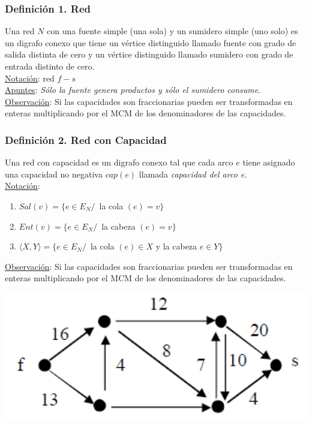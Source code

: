 \documentclass{article}
\newcommand{\tq}{/\,}                                   %
\begin{document}
\subsubsection*{Definición 1. Red}
Una red $N$ con una fuente simple (una sola) y un sumidero simple (uno solo) es un digrafo
conexo que tiene un vértice distinguido llamado fuente con grado de salida distinta de
cero y un vértice distinguido llamado sumidero con grado de entrada distinto de cero.
\\\underline{Notación}: red $f-s$
\\\underline{Apuntes}: \emph{Sólo la fuente genera productos y sólo el sumidero consume}.
\\\underline{Observación}: Si las capacidades son fraccionarias pueden ser transformadas en enteras
multiplicando por el MCM de los denominadores de las capacidades.

\subsubsection*{Definición 2. Red con Capacidad}
Una red con capacidad es un digrafo conexo tal que cada arco $e$ tiene
asignado una capacidad no negativa $cap(e)$ llamada \emph{capacidad del arco e}.
\\\underline{Notación}:
\begin{enumerate}
    \item $Sal(v) = \{ e \in E_N \tq$ la cola $(e) = v \}$
    \item $Ent(v) = \{ e \in E_N \tq$ la cabeza $(e) = v \}$
    \item $\langle X,Y \rangle = \{ e \in E_N \tq$ la cola $(e) \in X$ y la cabeza $e \in Y \}$
\end{enumerate}
\underline{Observación}: Si las capacidades son fraccionarias pueden ser transformadas en enteras
multiplicando por el MCM de los denominadores de las capacidades.
\begin{center}
    \includegraphics[width=.60\textwidth]{redDeFlujo.PNG}
\end{center}
\end{document}
